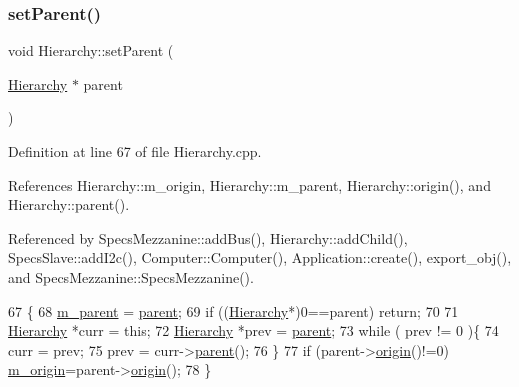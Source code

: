 \subsubsection{\texorpdfstring{set\+Parent()}{setParent()}}
{\footnotesize\ttfamily void Hierarchy\+::set\+Parent (\begin{DoxyParamCaption}\item[{\hyperlink{classHierarchy}{Hierarchy} $\ast$}]{parent }\end{DoxyParamCaption})\hspace{0.3cm}{\ttfamily [inherited]}}



Definition at line 67 of file Hierarchy.\+cpp.



References Hierarchy\+::m\+\_\+origin, Hierarchy\+::m\+\_\+parent, Hierarchy\+::origin(), and Hierarchy\+::parent().



Referenced by Specs\+Mezzanine\+::add\+Bus(), Hierarchy\+::add\+Child(), Specs\+Slave\+::add\+I2c(), Computer\+::\+Computer(), Application\+::create(), export\+\_\+obj(), and Specs\+Mezzanine\+::\+Specs\+Mezzanine().


\begin{DoxyCode}
67                                               \{
68   \hyperlink{classHierarchy_a5814bb280d4e8539ab25ab6cbfb9cc4f}{m\_parent} = \hyperlink{classHierarchy_a1c7bec8257e717f9c1465e06ebf845fc}{parent};
69   \textcolor{keywordflow}{if} ((\hyperlink{classHierarchy}{Hierarchy}*)0==parent) \textcolor{keywordflow}{return};
70 
71   \hyperlink{classHierarchy}{Hierarchy} *curr = \textcolor{keyword}{this};
72   \hyperlink{classHierarchy}{Hierarchy} *prev = \hyperlink{classHierarchy_a1c7bec8257e717f9c1465e06ebf845fc}{parent};
73   \textcolor{keywordflow}{while} ( prev != 0 )\{
74     curr = prev;
75     prev = curr->\hyperlink{classHierarchy_a1c7bec8257e717f9c1465e06ebf845fc}{parent}();
76   \}
77   \textcolor{keywordflow}{if} (parent->\hyperlink{classHierarchy_aee461dc930ce3871636ff87f075b1b83}{origin}()!=0) \hyperlink{classHierarchy_a16c73e557d3a7c156ffb5dc4102d148e}{m\_origin}=parent->\hyperlink{classHierarchy_aee461dc930ce3871636ff87f075b1b83}{origin}();
78 \}
\end{DoxyCode}
\mbox{\label{classFEB__v1_abb013a3441c02f57cea07a244554fdd5}} 
